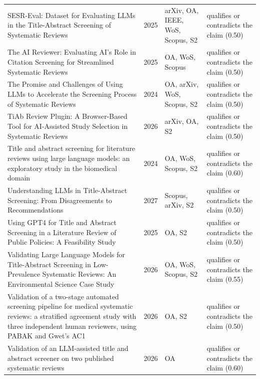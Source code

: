 \begin{longtable}{@{}%
  >{\raggedright\arraybackslash}p{}c%
  >{\raggedright\arraybackslash}p{}%
  >{\raggedright\arraybackslash}p{}@{}}
SESR-Eval: Dataset for Evaluating LLMs in the Title-Abstract Screening of Systematic Reviews & 2025 & arXiv, OA, IEEE, WoS, Scopus, S2 & qualifies or contradicts the claim (0.50) \\
The AI Reviewer: Evaluating AI's Role in Citation Screening for Streamlined Systematic Reviews & 2025 & OA, WoS, Scopus & qualifies or contradicts the claim (0.50) \\
The Promise and Challenges of Using LLMs to Accelerate the Screening Process of Systematic Reviews & 2024 & OA, arXiv, WoS, Scopus, S2 & qualifies or contradicts the claim (0.50) \\
TiAb Review Plugin: A Browser-Based Tool for AI-Assisted Study Selection in Systematic Reviews & 2026 & arXiv, OA, S2 & qualifies or contradicts the claim (0.50) \\
Title and abstract screening for literature reviews using large language models: an exploratory study in the biomedical domain & 2024 & OA, WoS, Scopus, S2 & qualifies or contradicts the claim (0.60) \\
Understanding LLMs in Title-Abstract Screening: From Disagreements to Recommendations & 2027 & Scopus, arXiv, S2 & qualifies or contradicts the claim (0.50) \\
Using GPT4 for Title and Abstract Screening in a Literature Review of Public Policies: A Feasibility Study & 2025 & OA, S2 & qualifies or contradicts the claim (0.50) \\
Validating Large Language Models for Title-Abstract Screening in Low-Prevalence Systematic Reviews: An Environmental Science Case Study & 2026 & OA, WoS, Scopus, S2 & qualifies or contradicts the claim (0.55) \\
Validation of a two-stage automated screening pipeline for medical systematic reviews: a stratified agreement study with three independent human reviewers, using PABAK and Gwet's AC1 & 2026 & OA, S2 & qualifies or contradicts the claim (0.50) \\
Validation of an LLM-assisted title and abstract screener on two published systematic reviews & 2026 & OA & qualifies or contradicts the claim (0.60) \\
\end{longtable}
\endgroup
